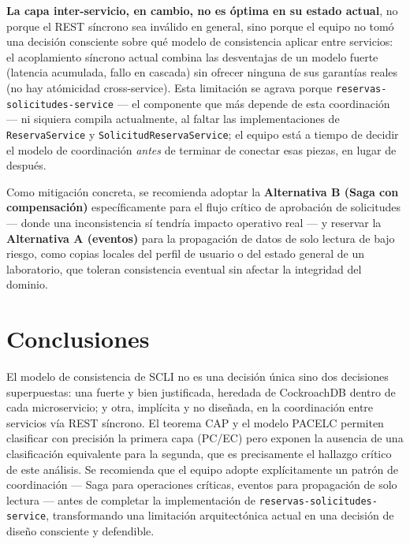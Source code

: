 \documentclass[12pt,letterpaper]{article}
\begin{document}
\textbf{La capa inter-servicio, en cambio, no es \'optima en su estado
actual}, no porque el REST s\'incrono sea inv\'alido en general, sino
porque el equipo no tom\'o una decisi\'on consciente sobre qu\'e modelo de
consistencia aplicar entre servicios: el acoplamiento s\'incrono actual
combina las desventajas de un modelo fuerte (latencia acumulada, fallo en
cascada) sin ofrecer ninguna de sus garant\'ias reales (no hay
at\'omicidad cross-service). Esta limitaci\'on se agrava porque
\texttt{reservas-solicitudes-service} --- el componente que m\'as depende
de esta coordinaci\'on --- ni siquiera compila actualmente, al faltar las
implementaciones de \texttt{ReservaService} y
\texttt{SolicitudReservaService}; el equipo est\'a a tiempo de decidir el
modelo de coordinaci\'on \emph{antes} de terminar de conectar esas piezas,
en lugar de despu\'es.

Como mitigaci\'on concreta, se recomienda adoptar la \textbf{Alternativa
B (Saga con compensaci\'on)} espec\'ificamente para el flujo cr\'itico de
aprobaci\'on de solicitudes --- donde una inconsistencia s\'i tendr\'ia
impacto operativo real --- y reservar la \textbf{Alternativa A (eventos)}
para la propagaci\'on de datos de solo lectura de bajo riesgo, como copias
locales del perfil de usuario o del estado general de un laboratorio, que
toleran consistencia eventual sin afectar la integridad del dominio.

\section{Conclusiones}

El modelo de consistencia de SCLI no es una decisi\'on \'unica sino dos
decisiones superpuestas: una fuerte y bien justificada, heredada de
CockroachDB dentro de cada microservicio; y otra, impl\'icita y no
dise\~nada, en la coordinaci\'on entre servicios v\'ia REST s\'incrono. El
teorema CAP y el modelo PACELC permiten clasificar con precisi\'on la
primera capa (PC/EC) pero exponen la ausencia de una clasificaci\'on
equivalente para la segunda, que es precisamente el hallazgo cr\'itico de
este an\'alisis. Se recomienda que el equipo adopte expl\'icitamente un
patr\'on de coordinaci\'on --- Saga para operaciones cr\'iticas, eventos
para propagaci\'on de solo lectura --- antes de completar la
implementaci\'on de \texttt{reservas-solicitudes-service}, transformando
una limitaci\'on arquitect\'onica actual en una decisi\'on de dise\~no
consciente y defendible.
\end{document}

